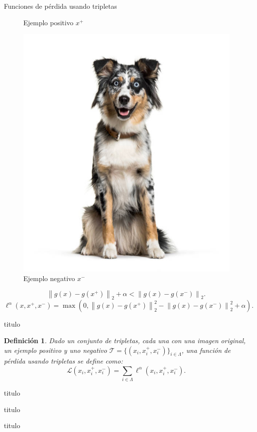 \documentclass[aspectratio=169]{beamer}
\newcommand{\norm}[1]{\left\lVert#1\right\rVert}
\newcommand{\ps}{x^+}
\newcommand{\ns}{x^-}
\newtheorem{defi}{Definición}
\begin{document}
\begin{frame}{Funciones de pérdida usando tripletas}
\begin{figure}[H]
      \caption*{Ejemplo positivo $\ps$}\label{fig:c2}
      \endminipage
      \centering
      \includegraphics[scale=0.1]{doggo}
      \caption*{Ejemplo negativo $\ns$}\label{fig:doggo}
      \endminipage
    \end{figure}

    \[
    \norm{g(x) - g(\ps)}_2 + \alpha < \norm{g(x) - g(\ns)}_2.
    \]
    \[
      \ell^\alpha (x,\ps,\ns) = \max \left(0, \norm{g(x) - g(\ps)}_2^2 - \norm{g(x) - g(\ns)}_2^2 + \alpha\right).
    \]

  \end{frame}
  
  \begin{frame}{titulo}


    \begin{defi}
      Dado un conjunto de tripletas, cada una con una imagen original, un ejemplo positivo y uno negativo  \(\mathcal T = \{(x_i,\ps_i,\ns_i)\}_{i \in \Lambda} \), una función de pérdida usando tripletas se define como:
      \[
      \mathcal L (x_i,\ps_i,\ns_i) = \sum_{i \in \Lambda} \ell^\alpha(x_i,\ps_i,\ns_i).
      \]

    \end{defi}
    
  
  \end{frame}
  
  \begin{frame}{titulo}
  
  \end{frame}

  
  \begin{frame}{titulo}
  
  \end{frame}
  
  \begin{frame}{titulo}
  
  \end{frame}
\end{document}
